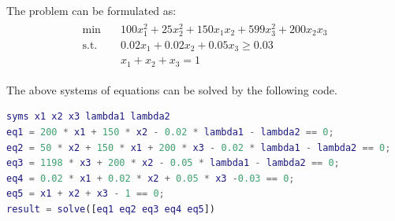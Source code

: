 \documentclass[fleqn,10pt]{wlscirep}
\begin{document}


The problem can be formulated as:
\begin{align} \begin{split}
    \min \quad & 100 x_{1}^2 + 25 x_{2}^2 + 150 x_{1} x_{2} + 599 x_{3}^2 + 200 x_{2} x_{3} \\
    \text{s.t.} \quad & 0.02 x_{1} + 0.02 x_{2} + 0.05 x_{3} \geq 0.03 \\
    & x_{1} + x_{2} + x_{3} = 1
\end{split} \end{align} 

The above systems of equations can be solved by the following code.

\begin{lstlisting}[language=MATLAB, caption=MATLAB code to solve the equations]
syms x1 x2 x3 lambda1 lambda2
eq1 = 200 * x1 + 150 * x2 - 0.02 * lambda1 - lambda2 == 0;
eq2 = 50 * x2 + 150 * x1 + 200 * x3 - 0.02 * lambda1 - lambda2 == 0;
eq3 = 1198 * x3 + 200 * x2 - 0.05 * lambda1 - lambda2 == 0;
eq4 = 0.02 * x1 + 0.02 * x2 + 0.05 * x3 -0.03 == 0;
eq5 = x1 + x2 + x3 - 1 == 0;
result = solve([eq1 eq2 eq3 eq4 eq5])
\end{lstlisting}
\end{document}
